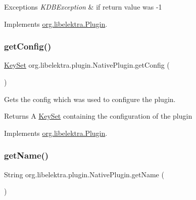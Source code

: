 \begin{DoxyExceptions}{Exceptions}
{\em K\+D\+B\+Exception} & if return value was -\/1 \\
\hline
\end{DoxyExceptions}


Implements \hyperlink{interfaceorg_1_1libelektra_1_1Plugin_a9b8362549b7ab8ca5eff39cf6b7c8046}{org.\+libelektra.\+Plugin}.

\mbox{\label{classorg_1_1libelektra_1_1plugin_1_1NativePlugin_af9c78565029ed2ae38241759549e4b5a}} 
\subsubsection{\texorpdfstring{get\+Config()}{getConfig()}}
{\footnotesize\ttfamily \hyperlink{classorg_1_1libelektra_1_1KeySet}{Key\+Set} org.\+libelektra.\+plugin.\+Native\+Plugin.\+get\+Config (\begin{DoxyParamCaption}{ }\end{DoxyParamCaption})\hspace{0.3cm}{\ttfamily [inline]}}



Gets the config which was used to configure the plugin. 

\begin{DoxyReturn}{Returns}
A \hyperlink{classorg_1_1libelektra_1_1KeySet}{Key\+Set} containing the configuration of the plugin 
\end{DoxyReturn}


Implements \hyperlink{interfaceorg_1_1libelektra_1_1Plugin_a95ee37a782d5bd32fd95478788652d44}{org.\+libelektra.\+Plugin}.

\mbox{\label{classorg_1_1libelektra_1_1plugin_1_1NativePlugin_a606fc8f54bc810d874176103859976ab}} 
\subsubsection{\texorpdfstring{get\+Name()}{getName()}}
{\footnotesize\ttfamily String org.\+libelektra.\+plugin.\+Native\+Plugin.\+get\+Name (\begin{DoxyParamCaption}{ }\end{DoxyParamCaption})\hspace{0.3cm}{\ttfamily [inline]}}




